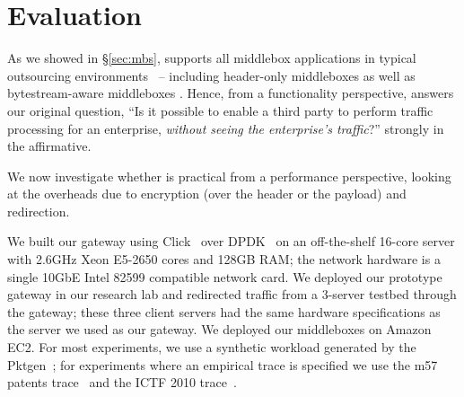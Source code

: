 \section{Evaluation} \label{sec:eval}

As we showed in \S\ref{sec:mbs}, \sys supports all middlebox applications in typical outsourcing environments~\cite{aplomb,nfv} -- including header-only middleboxes as well as bytestream-aware middleboxes . 
Hence, from a functionality perspective, \sys answers our original question, ``Is it possible to enable a third party to perform traffic processing for an enterprise, {\em without seeing the enterprise's traffic}?''  strongly in the affirmative.

We now investigate whether \sys is practical from a performance perspective, looking at the overheads due to encryption (over the header or the payload) and redirection. 

We built our gateway using Click~\cite{click} over DPDK~\cite{dpdk} on an off-the-shelf 16-core server with 2.6GHz Xeon E5-2650 cores and 128GB RAM; the network hardware is a single 10GbE Intel 82599 compatible network card. 
We deployed our prototype gateway in our research lab and redirected traffic from a 3-server testbed through the gateway; these three client servers had the same hardware specifications as the server we used as our gateway.
We deployed our middleboxes on Amazon EC2.
For most experiments, we use a synthetic workload generated by the Pktgen~\cite{pktgen}; for experiments where an empirical trace is specified we use the m57 patents trace~\cite{m57} and the ICTF 2010 trace~\cite{ictf}.


